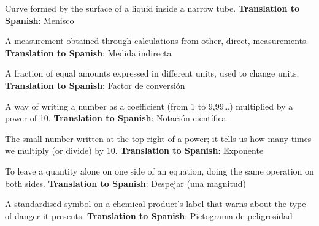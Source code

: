 \begin{vocabulary}[Meniscus]
    Curve formed by the surface of a liquid inside a narrow tube. \newline
    \textbf{Translation to Spanish}: Menisco
\end{vocabulary}

\begin{vocabulary}
    A measurement obtained through calculations from other, direct, measurements. \newline
    \textbf{Translation to Spanish}: Medida indirecta
\end{vocabulary}

\begin{vocabulary}
    A fraction of equal amounts expressed in different units, used to change units. \newline
    \textbf{Translation to Spanish}: Factor de conversión
\end{vocabulary}

\begin{vocabulary}
    A way of writing a number as a coefficient (from 1 to 9,99\ldots) multiplied by a power of 10. \newline
    \textbf{Translation to Spanish}: Notación científica
\end{vocabulary}

\begin{vocabulary}[Exponent]
    The small number written at the top right of a power; it tells us how many times we multiply (or divide) by 10. \newline
    \textbf{Translation to Spanish}: Exponente
\end{vocabulary}

\begin{vocabulary}
    To leave a quantity alone on one side of an equation, doing the same operation on both sides. \newline
    \textbf{Translation to Spanish}: Despejar (una magnitud)
\end{vocabulary}

\begin{vocabulary}
    A standardised symbol on a chemical product's label that warns about the type of danger it presents. \newline
    \textbf{Translation to Spanish}: Pictograma de peligrosidad
\end{vocabulary}

